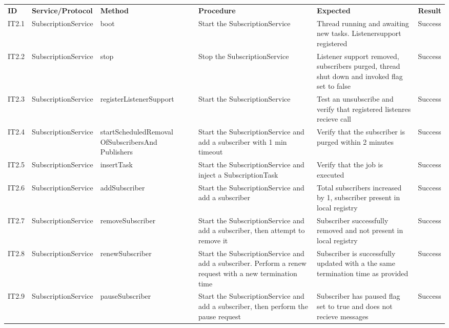 \begin{table}[ht!]
\tiny
\begin{tabular}{|m{0.5cm}|m{1.5cm}|m{1.5cm}|m{3cm}|m{3cm}|m{1.5cm}|}
\hline
\rowcolor{lightgray}
\multicolumn{6}{|c|}{\textbf{Subscription service}} \\ \hline
\rowcolor{lightgray}
\textbf{ID} & \textbf{Service/Protocol} & \textbf{Method} & \textbf{Procedure} & \textbf{Expected} & \textbf{Result}\\ \hline
IT2.1 & SubscriptionService & boot & Start the SubscriptionService & Thread running and awaiting new tasks. Listenersupport registered & Success \\ \hline
IT2.2 & SubscriptionService & stop & Stop the SubscriptionService & Listener support removed, subscribers purged, thread shut down and invoked flag set to false & Success \\ \hline
IT2.3 & SubscriptionService & registerListenerSupport & Start the SubscriptionService & Test an unsubscribe and verify that registered listenres recieve call & Success \\ \hline
IT2.4 & SubscriptionService & startScheduledRemoval OfSubscribersAnd Publishers & Start the SubscriptionService and add a subscriber with 1 min timeout & Verify that the subscriber is purged within 2 minutes & Success \\ \hline
IT2.5 & SubscriptionService & insertTask & Start the SubscriptionService and inject a SubscriptionTask & Verify that the job is executed & Success \\ \hline
IT2.6 & SubscriptionService & addSubscriber & Start the SubscriptionService and add a subscriber & Total subscribers increased by 1, subscriber present in local registry & Success \\ \hline
IT2.7 & SubscriptionService & removeSubscriber & Start the SubscriptionService and add a subscriber, then attempt to remove it & Subscriber successfully removed and not present in local registry & Success \\ \hline
IT2.8 & SubscriptionService & renewSubscriber & Start the SubscriptionService and add a subscriber. Perform a renew request with a new termination time & Subscriber is successfully updated with a the same termination time as provided & Success \\ \hline
IT2.9 & SubscriptionService & pauseSubscriber & Start the SubscriptionService and add a subscriber, then perform the pause request & Subscriber has paused flag set to true and does not recieve messages & Success \\ \hline

\end{tabular}
\end{table}
